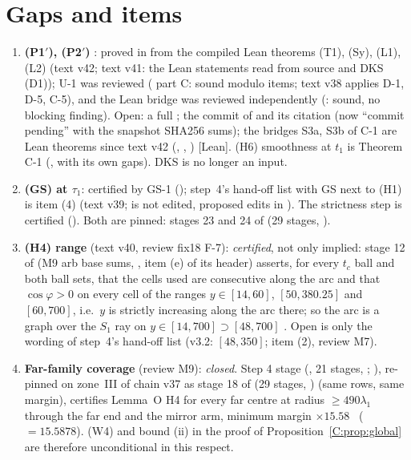 \documentclass[11pt]{article}
\begin{document}
\section{Gaps and items}\label{C:sec:gaps}
\begin{enumerate}[leftmargin=*]
\providecommand{\LeanSthree}{\textup{[Lean]}}%
\item \textbf{(P1$'$), (P2$'$)} \tH: proved in  from the compiled Lean theorems (T1), (Sy), (L1), (L2) \cite{CWFlow} (text v42; text v41: the Lean statements read from source and DKS (D1)); U-1 was reviewed ( part C: sound modulo items; text v38 applies D-1, D-5, C-5), and the Lean bridge was reviewed independently (: sound, no blocking finding). Open: a full ; the commit of  and its citation (now ``commit pending'' with the snapshot SHA256 sums); the bridges S3a, S3b of C-1 are Lean theorems since text v42 (, , ) \LeanSthree. (H6) smoothness at $t_1$ is Theorem C-1 (, with its own gaps). DKS is no longer an input.
\item \textbf{(GS) at $\tau_1$}: certified by GS-1 (); step~4's hand-off list with GS next to (H1) is  item (4) (text v39;  is not edited, proposed edits in ). The strictness step is certified (). Both are pinned: stages 23 and 24 of  (29 stages, ).
\item \textbf{(H4) range} (text v40, review fix18 F-7): \emph{certified}, not only implied: stage 12 of  (M9 arb base sums, , item (e) of its header) asserts, for every $t_c$ ball and both ball sets, that the cells used are consecutive along the arc and that $\cos\varphi>0$ on every cell of the ranges $y\in[14,60]$, $[50,380.25]$ and $[60,700]$, i.e.\ $y$ is strictly increasing along the arc there; so the arc is a graph over the $S_1$ ray on $y\in[14,700]\supset[48,700]$ \tC. Open is only the wording of step~4's hand-off list (v3.2: $[48,350]$;  item (2), review M7).
\item \textbf{Far-family coverage} (review M9): \emph{closed}. Step 4 stage  (, 21 stages, ; ), re-pinned on zone~III of chain v37 as stage 18 of  (29 stages, ) (same rows, same margin), certifies Lemma~O H4 for every far centre at radius $\ge490\lambda_1$ through the far end and the mirror arm, minimum margin $\times15.58$ \tC\ ($=15.5878$). (W4) and bound (ii) in the proof of Proposition~\ref{C:prop:global} are therefore unconditional in this respect.

\end{enumerate}
\end{document}

